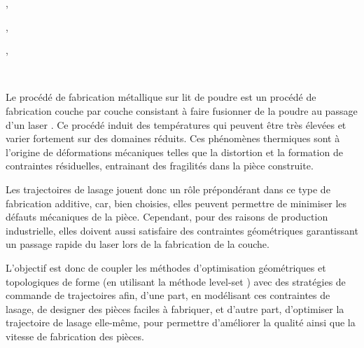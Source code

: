 \documentclass[10pt]{article}
\def\titre#1{\begin{center}{\Large{\bf #1}}\end{center}}
\def\orateur#1#2{\begin{center}{\underline{\large{\bf #1}}}, {#2}\end{center}}
\def\auteur#1#2{\begin{center}{\large{\bf #1}}, {#2}\end{center}}
\def\motscles#1{%
	\ifx#1\IsUndefined\relax\else\noindent{\normalsize{\bf Mots-cl\'es :}} #1\\ \fi}
\begin{document}
%
%
%
\titre{\Titre}%
\orateur{\NomOrateur}{\AdresseCourteOrateur}
\auteur{\NomAuteurI}{\AdresseCourteAuteurI}
\auteur{\NomAuteurII}{\AdresseCourteAuteurII}

%
\motscles{\listmotcles}


Le proc\'ed\'e de fabrication m\'etallique sur lit de poudre est un proc\'ed\'e de fabrication couche par couche consistant \`a faire fusionner de la poudre au passage d'un laser \cite{ref2}. Ce proc\'ed\'e induit des temp\'eratures qui peuvent \^etre tr\`es \'elev\'ees et varier fortement sur des domaines r\'eduits. Ces ph\'enom\`enes thermiques sont \`a l'origine de d\'eformations m\'ecaniques telles que la distortion et la formation de contraintes r\'esiduelles, entrainant des fragilit\'es dans la pi\`ece construite.  

\vspace{1cm}

Les trajectoires de lasage jouent donc un r\^ole pr\'epond\'erant dans ce type de fabrication additive, car, bien choisies, elles peuvent permettre de minimiser les d\'efauts m\'ecaniques de la pi\`ece. Cependant, pour des raisons de production industrielle, elles doivent aussi satisfaire des contraintes g\'eom\'etriques garantissant un passage rapide du laser lors de la fabrication de la couche.

\vspace{1cm}

L'objectif est  donc de coupler les m\'ethodes d'optimisation g\'eom\'etriques et topologiques de forme (en utilisant la m\'ethode level-set \cite{ref1}) avec des strat\'egies de commande de trajectoires afin, d'une part, en mod\'elisant ces contraintes de lasage, de designer des pi\`eces faciles \`a fabriquer, et d'autre part, d'optimiser la trajectoire de lasage elle-m\^eme, pour permettre d'am\'eliorer la qualit\'e ainsi que la vitesse de fabrication des pi\`eces.
\end{document}
